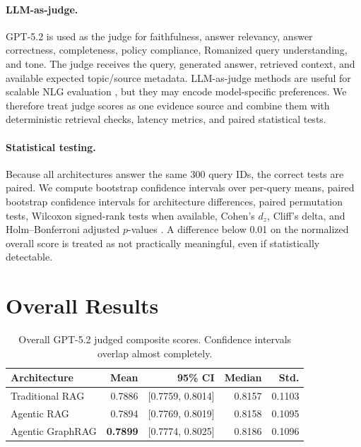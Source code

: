 \documentclass[10pt,twocolumn]{article}
\begin{document}
\paragraph{LLM-as-judge.}
GPT-5.2 is used as the judge for faithfulness, answer relevancy, answer correctness, completeness, policy compliance, Romanized query understanding, and tone. The judge receives the query, generated answer, retrieved context, and available expected topic/source metadata. LLM-as-judge methods are useful for scalable NLG evaluation \cite{liu2023geval,kocmi2023large,guo2023close}, but they may encode model-specific preferences. We therefore treat judge scores as one evidence source and combine them with deterministic retrieval checks, latency metrics, and paired statistical tests.

\paragraph{Statistical testing.}
Because all architectures answer the same 300 query IDs, the correct tests are paired. We compute bootstrap confidence intervals over per-query means, paired bootstrap confidence intervals for architecture differences, paired permutation tests, Wilcoxon signed-rank tests when available, Cohen's $d_z$, Cliff's delta, and Holm--Bonferroni adjusted $p$-values \cite{efron1994bootstrap,demsar2006statistical}. A difference below 0.01 on the normalized overall score is treated as not practically meaningful, even if statistically detectable.

\section{Overall Results}

\begin{table}[t]
\centering
\small
\begin{tabular}{lrrrr}
\toprule
Architecture & Mean & 95\% CI & Median & Std. \\
\midrule
Traditional RAG & 0.7886 & [0.7759, 0.8014] & 0.8157 & 0.1103 \\
Agentic RAG & 0.7894 & [0.7769, 0.8019] & 0.8158 & 0.1095 \\
Agentic GraphRAG & \textbf{0.7899} & [0.7774, 0.8025] & 0.8186 & 0.1096 \\
\bottomrule
\end{tabular}
\caption{Overall GPT-5.2 judged composite scores. Confidence intervals overlap almost completely.}
\label{tab:overall}
\end{table}
\end{document}
